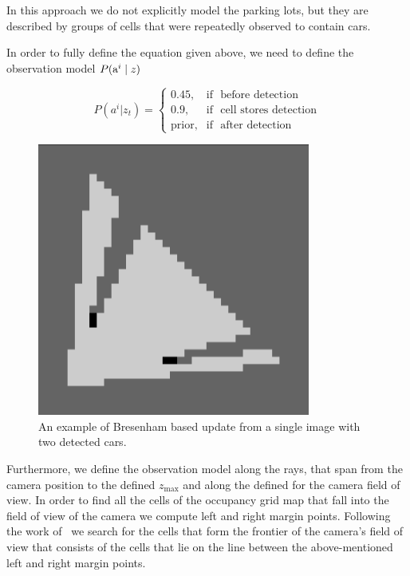 In this approach we do not explicitly model the parking lots, but they are
described by groups of cells that were repeatedly observed to contain cars.

In order to fully define the equation given above, we need to define the
observation model $P({\mbox{a}^i} \mid z)$

\begin{equation}
\label{eq:observation_model}
P(a^i | z_t) = \begin{cases} 0.45, & \mbox{if } \mbox{ before detection} \\ 0.9, & \mbox{if } \mbox{ cell stores detection} \\ \mbox{prior}, & \mbox{if } \mbox{ after detection} \end{cases}
\end{equation}

\begin{figure}
\begin{center}
\includegraphics[width=0.8\textwidth]{pictures/testmap.png}
\end{center}
\vspace{-10pt}
\caption{An example of Bresenham based update from a single image with two detected cars.}
\vspace{-10pt}
\label{fig:maptest}
\end{figure}

Furthermore, we define the observation model along the rays, that span from
the camera position to the defined $z_{\max}$ and along the defined for the
camera field of view. In order to find all the cells of the occupancy grid map
that fall into the field of view of the camera we compute left and right
margin points. Following the work of~\citet{bresenham1965} we search for the
cells that form the frontier of the camera's field of view that consists of
the cells that lie on the line between the above-mentioned left and right
margin points.


